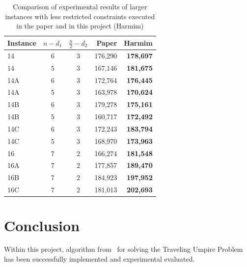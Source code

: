 \documentclass[a4paper, 10pt, twocolumn]{article}
\begin{document}
    \begin{table}[hbt]
        \centering

        \begin{tabular}{|l||c|c|r|r|}
            \hline
            Instance & $ n - d_1 $ & $ \frac{n}{2} - d_2 $ & Paper
            & \textbf{Harmim} \\ \hline \hline

            14 & 6 & 3 & 176,290 & \textbf{178,697} \\ \hline
            14 & 5 & 3 & 167,146 & \textbf{181,675} \\ \hline
            14A & 6 & 3 & 172,764 & \textbf{176,445} \\ \hline
            14A & 5 & 3 & 163,978 & \textbf{170,624} \\ \hline
            14B & 6 & 3 & 179,278 & \textbf{175,161} \\ \hline
            14B & 5 & 3 & 160,717 & \textbf{172,492} \\ \hline
            14C & 6 & 3 & 172,243 & \textbf{183,794} \\ \hline
            14C & 5 & 3 & 168,970 & \textbf{173,963} \\ \hline
            16 & 7 & 2 & 166,274 & \textbf{181,548} \\ \hline
            16A & 7 & 2 & 177,857 & \textbf{189,470} \\ \hline
            16B & 7 & 2 & 184,923 & \textbf{197,952} \\ \hline
            16C & 7 & 2 & 181,013 & \textbf{202,693} \\ \hline
        \end{tabular}

        \caption{%
            Comparison of experimental results of larger instances
            with less restricted constraints executed in the paper and
            in this project (Harmim)
        }
        \label{tab:exp2}
    \end{table}


    \section{Conclusion}
    \label{sec:conclusion}

    Within this project, algorithm from~\cite{bendersCutsPaper}
    for solving the Traveling Umpire Problem has been successfully
    implemented and experimental evaluated.


    
    \renewcommand{\refname}{Bibliography}
    
\end{document}
